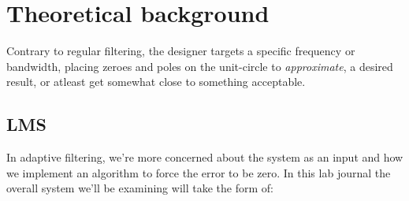 \section{Theoretical background}
Contrary to regular filtering, the designer targets a specific frequency or bandwidth, 
placing zeroes and poles on the unit-circle to \textit{approximate}, a desired result, or 
atleast get somewhat close to something acceptable.\\

\subsection{LMS}
In adaptive filtering, we're more concerned about the system as an input and how we implement
an algorithm to force the error to be zero. In this lab journal the overall system we'll be examining
will take the form of:


